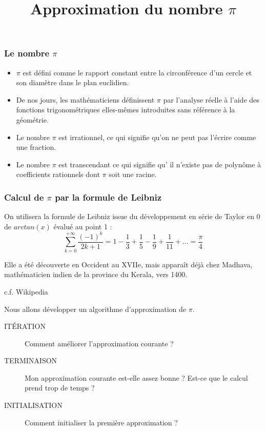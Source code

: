 \documentclass[10pt]{beamer}
\title{Approximation du nombre $\pi$}
\begin{document}
\maketitle



\begin{frame}
  \frametitle{Le nombre $\pi$}
  \begin{itemize}
  \item $\pi$ est défini comme le rapport constant entre la circonférence d’un cercle et son diamètre dans le plan euclidien.
  \item De nos jours, les mathématiciens définissent $\pi$ par l’analyse réelle à l’aide des fonctions trigonométriques elles-mêmes introduites sans référence à la géométrie.
  \item Le nombre $\pi$ est \alert{irrationnel}, ce qui signifie qu’on ne peut pas l’écrire comme une fraction.
  \item Le nombre $\pi$ est \alert{transcendant} ce qui signifie qu’ il n’existe pas de polynôme à coefficients rationnels dont $\pi$ soit une racine.
  \end{itemize}
\end{frame}


\begin{frame}
  \frametitle{Calcul de $\pi$ par la formule de Leibniz}
  On utilisera la formule de Leibniz issue du développement en série de Taylor en 0 de $arctan(x)$ évalué au point 1 :
  \alert{
    \[
      \sum_{k=0}^{+\infty} \frac{(-1)^k}{2k+ 1} = 1 - \frac{1}{3} + \frac{1}{5}  - \frac{1}{9} + \frac{1}{11} + \ldots = \frac{\pi}{4}
    \]
    }

Elle a été découverte en Occident au XVIIe, mais apparaît déjà chez Madhava, mathématicien indien de la province du Kerala, vers 1400.
\begin{flushright}
c.f. Wikipedia  
\end{flushright}

Nous allons développer un algorithme d'approximation de $\pi$.
  \begin{description}
  \item[ITÉRATION] Comment améliorer l'approximation courante ?
  \item[TERMINAISON] Mon approximation courante est-elle assez bonne ? Est-ce que le calcul prend trop de temps ? 
  \item[INITIALISATION] Comment initialiser la première approximation ? 
  \end{description}

\end{frame}
\end{document}
